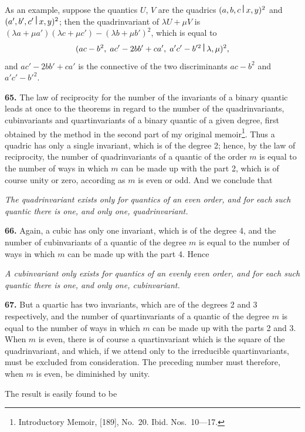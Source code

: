 \documentclass[11pt,a4paper]{book}
\begin{document}
\begin{center}
As an example, suppose the quantics $U$, $V$ are the quadrics $(a,b,c\,\raisebox{0.5ex}{\textbf{\textbar}}\,x,y)^2$ and $(a',b',c'\,\raisebox{0.5ex}{\textbf{\textbar}}\,x,y)^2$; then the quadrinvariant of $\lambda U + \mu V$ is $(\lambda a + \mu a')(\lambda c + \mu c') - (\lambda b + \mu b')^2$, which is equal to
\[(ac-b^2,\; ac'-2bb'+ca',\; a'c'-b'^2\,\raisebox{0.5ex}{\textbf{\textbar}}\,\lambda,\mu)^2,\]
and $ac'-2bb'+ca'$ is the connective of the two discriminants $ac-b^2$ and $a'c'-b'^2$.

\newpage

\medskip
\noindent\textbf{65.} The law of reciprocity for the number of the invariants of a binary quantic leads at once to the theorems in regard to the number of the quadrinvariants, cubinvariants and quartinvariants of a binary quantic of a given degree, first obtained by the method in the second part of my original memoir\footnote{Introductory Memoir, [189], No.~20. Ibid. Nos.~10---17.}. Thus a quadric has only a single invariant, which is of the degree 2; hence, by the law of reciprocity, the number of quadrinvariants of a quantic of the order $m$ is equal to the number of ways in which $m$ can be made up with the part 2, which is of course unity or zero, according as $m$ is even or odd. And we conclude that

\textit{The quadrinvariant exists only for quantics of an even order, and for each such quantic there is one, and only one, quadrinvariant.}

\medskip
\noindent\textbf{66.} Again, a cubic has only one invariant, which is of the degree 4, and the number of cubinvariants of a quantic of the degree $m$ is equal to the number of ways in which $m$ can be made up with the part 4. Hence

\textit{A cubinvariant only exists for quantics of an evenly even order, and for each such quantic there is one, and only one, cubinvariant.}

\medskip
\noindent\textbf{67.} But a quartic has two invariants, which are of the degrees 2 and 3 respectively, and the number of quartinvariants of a quantic of the degree $m$ is equal to the number of ways in which $m$ can be made up with the parts 2 and 3. When $m$ is even, there is of course a quartinvariant which is the square of the quadrinvariant, and which, if we attend only to the irreducible quartinvariants, must be excluded from consideration. The preceding number must therefore, when $m$ is even, be diminished by unity.

The result is easily found to be


\end{center}
\end{document}
